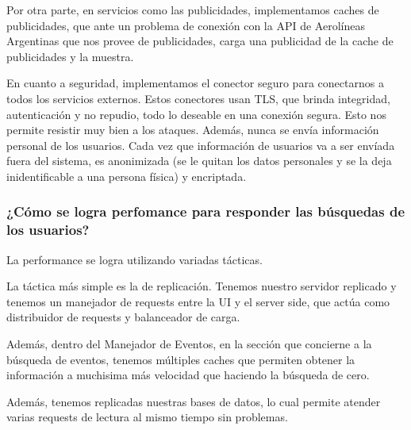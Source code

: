 Por otra parte, en servicios como las publicidades, implementamos caches de publicidades, que ante un problema de conexión con la API de Aerolíneas Argentinas que nos provee de publicidades, carga una publicidad de la cache de publicidades y la muestra.

En cuanto a seguridad, implementamos el conector seguro para conectarnos a todos los servicios externos. Estos conectores usan TLS, que brinda integridad, autenticación y no repudio, todo lo deseable en una conexión segura. Esto nos permite resistir muy bien a los ataques. Además, nunca se envía información personal de los usuarios. Cada vez que información de usuarios va a ser envíada fuera del sistema, es anonimizada (se le quitan los datos personales y se la deja
inidentificable a una persona física) y encriptada.

\subsubsection{¿Cómo se logra perfomance para responder las búsquedas de los usuarios?}

La performance se logra utilizando variadas tácticas.

La táctica más simple es la de replicación. Tenemos nuestro servidor replicado y tenemos un manejador de requests entre la UI y el server side, que actúa como distribuidor de requests y balanceador de carga.

Además, dentro del Manejador de Eventos, en la sección que concierne a la búsqueda de eventos, tenemos múltiples caches que permiten obtener la información a muchisima más velocidad que haciendo la búsqueda de cero. 

Además, tenemos replicadas nuestras bases de datos, lo cual permite atender varias requests de lectura al mismo tiempo sin problemas.


